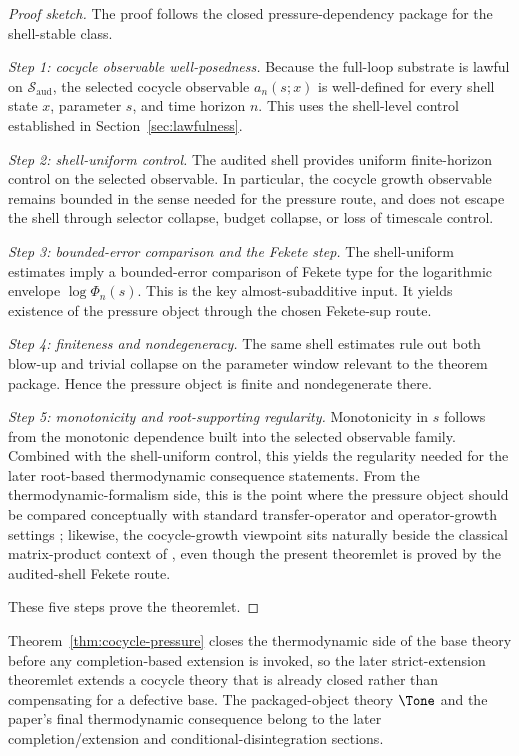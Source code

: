 \begin{proof}[Proof sketch]
The proof follows the closed pressure-dependency package for the shell-stable class.

\smallskip
\noindent\emph{Step 1: cocycle observable well-posedness.}
Because the full-loop substrate is lawful on \(\mathcal{S}_{\mathrm{aud}}\), the selected cocycle observable \(a_n(s;x)\) is well-defined for every shell state \(x\), parameter \(s\), and time horizon \(n\). This uses the shell-level control established in Section~\ref{sec:lawfulness}.

\smallskip
\noindent\emph{Step 2: shell-uniform control.}
The audited shell provides uniform finite-horizon control on the selected observable. In particular, the cocycle growth observable remains bounded in the sense needed for the pressure route, and does not escape the shell through selector collapse, budget collapse, or loss of timescale control.

\smallskip
\noindent\emph{Step 3: bounded-error comparison and the Fekete step.}
The shell-uniform estimates imply a bounded-error comparison of Fekete type for the logarithmic envelope \(\log \Phi_n(s)\). This is the key almost-subadditive input. It yields existence of the pressure object through the chosen Fekete-sup route.

\smallskip
\noindent\emph{Step 4: finiteness and nondegeneracy.}
The same shell estimates rule out both blow-up and trivial collapse on the parameter window relevant to the theorem package. Hence the pressure object is finite and nondegenerate there.

\smallskip
\noindent\emph{Step 5: monotonicity and root-supporting regularity.}
Monotonicity in \(s\) follows from the monotonic dependence built into the selected observable family. Combined with the shell-uniform control, this yields the regularity needed for the later root-based thermodynamic consequence statements. From the thermodynamic-formalism side, this is the point where the pressure object should be compared conceptually with standard transfer-operator and operator-growth settings \cite{Ruelle1978ThermodynamicFormalism,Baladi2000TransferOperators}; likewise, the cocycle-growth viewpoint sits naturally beside the classical matrix-product context of \cite{FurstenbergKesten1960RandomMatrices,Oseledets1968MET}, even though the present theoremlet is proved by the audited-shell Fekete route.

These five steps prove the theoremlet.
\end{proof}



Theorem~\ref{thm:cocycle-pressure} closes the thermodynamic side of the base theory before any completion-based extension is invoked, so the later strict-extension theoremlet extends a cocycle theory that is already closed rather than compensating for a defective base. The packaged-object theory \(\Tone\) and the paper's final thermodynamic consequence belong to the later completion/extension and conditional-disintegration sections.
